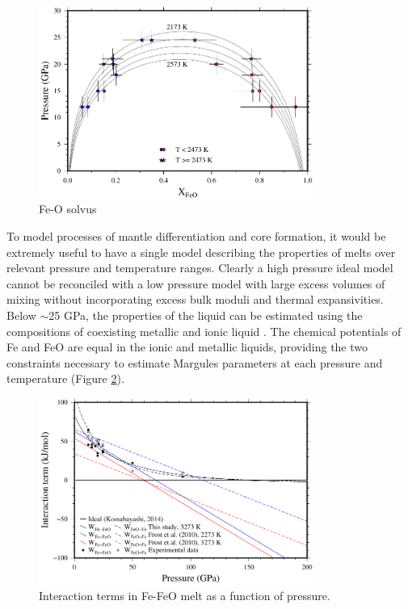 \documentclass[review]{elsarticle}
\begin{document}
\begin{figure}[ht!]
  \centering
  \includegraphics[width=0.8\textwidth]{figures/Fe_FeO_solvus}
  \caption{Fe-O solvus}
  \label{fig:Fe_O_solvus}
\end{figure}


To model processes of mantle differentiation and core formation, it would be extremely useful to have a single model describing the properties of melts over relevant pressure and temperature ranges. Clearly a high pressure ideal model cannot be reconciled with a low pressure model with large excess volumes of mixing without incorporating excess bulk moduli and thermal expansivities. Below $\sim$25 GPa, the properties of the liquid can be estimated using the compositions of coexisting metallic and ionic liquid \citep{TOT2007,Frostetal2010}. The chemical potentials of Fe and FeO are equal in the ionic and metallic liquids, providing the two constraints necessary to estimate Margules parameters at each pressure and temperature (Figure \ref{fig:Fe_O_interaction}).

\begin{figure}[ht!]
  \centering
  \includegraphics[width=0.8\textwidth]{figures/Fe_FeO_interaction_terms}
  \caption{Interaction terms in Fe-FeO melt as a function of pressure.}
  \label{fig:Fe_O_interaction}
\end{figure}
\end{document}

